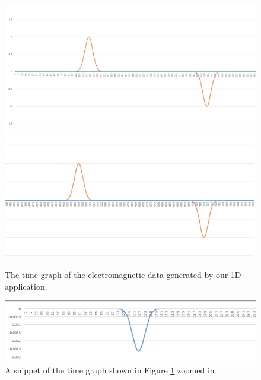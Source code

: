 \begin{figure}
	\centering
	\includegraphics[scale=0.75]{Figures/1DtimeGraph1}
	\includegraphics[scale=0.8]{Figures/1DtimeGraph2}
	\decoRule
	\caption[1D Electromagnetic Time Graph]{The time graph of the electromagnetic data generated by our 1D application.}
	\label{fig:emTimeGraph}
\end{figure}

\begin{figure}
	\centering
	\includegraphics{Figures/1DmagneticTimeSnippet}
	\decoRule
	\caption[1D Magnetic Time Snippet]{A snippet of the time graph shown in Figure \ref{fig:emTimeGraph} zoomed in}
	\label{fig:mTimeSnippet}
\end{figure}
